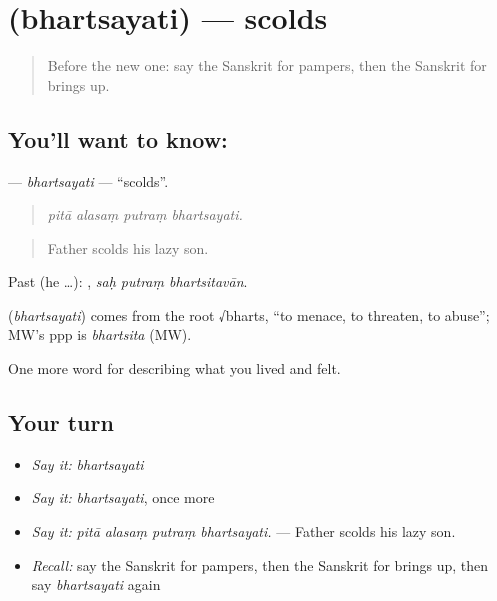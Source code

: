 \section[\texorpdfstring{\sk{भर्त्सयति} (bhartsayati)}{भर्त्सयति (bhartsayati)}]{ (bhartsayati) — scolds}

\label{lesson:SA-C494-bhartsayati}



\begin{quote}
Before the new one: say the Sanskrit for pampers, then the Sanskrit for brings up.
\end{quote}

\subsection*{You'll want to know: }
\textbf{} — \emph{bhartsayati} — \textquotedblleft{}scolds\textquotedblright{}.

\begin{quote}
   
\end{quote}

\begin{quote}
\emph{pitā alasaṃ putraṃ bhartsayati.}
\end{quote}

\begin{quote}
Father scolds his lazy son.
\end{quote}

Past (he …):   , \emph{saḥ putraṃ bhartsitavān}.

\begin{cousinweb}
\textbf{} (\emph{bhartsayati}) comes from the root √bharts, \textquotedblleft{}to menace, to threaten, to abuse\textquotedblright{}; MW's ppp is \emph{bhartsita} (MW).
\end{cousinweb}

\begin{grammarlens}[title={What you've built}]
One more word for describing what you lived and felt.
\end{grammarlens}

\subsection*{Your turn}
\begin{itemize}
\raggedright
  \item \emph{Say it:} \emph{bhartsayati}
  \item \emph{Say it:} \emph{bhartsayati}, once more
  \item \emph{Say it:} \emph{pitā alasaṃ putraṃ bhartsayati.} — Father scolds his lazy son.
  \item \emph{Recall:} say the Sanskrit for pampers, then the Sanskrit for brings up, then say \emph{bhartsayati} again
\end{itemize}

